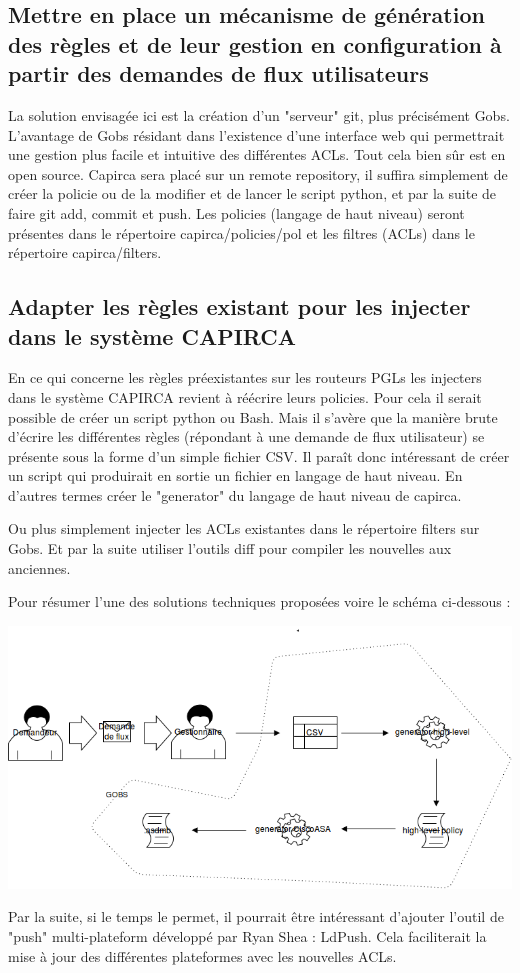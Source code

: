 \documentclass{article}
\begin{document}
\subsection{Mettre en place un mécanisme de génération des règles et de leur gestion en configuration à partir des demandes de flux utilisateurs}

La solution envisagée ici est la création d’un "serveur" git, plus précisément Gobs. L’avantage de Gobs résidant dans l’existence d’une interface web qui permettrait une gestion plus facile et intuitive des différentes ACLs. Tout cela bien sûr est en open source. Capirca sera placé sur un remote repository, il suffira simplement de créer la policie ou de la modifier et de lancer le script python, et par la suite de faire git add, commit et push. Les policies (langage de haut niveau) seront présentes dans le répertoire capirca/policies/pol et les filtres (ACLs) dans le répertoire capirca/filters. 

\maketitle
\subsection{Adapter les règles existant pour les injecter dans le système CAPIRCA}

En ce qui concerne les règles préexistantes sur les routeurs PGLs les injecters dans le système CAPIRCA revient à réécrire leurs policies. Pour cela il serait possible de créer un script python ou Bash. Mais il s’avère que la manière brute d’écrire les différentes règles (répondant à une demande de flux utilisateur) se présente sous la forme d’un simple fichier CSV. Il paraît donc intéressant de créer un script qui produirait en sortie un fichier en langage de haut niveau. En d’autres termes créer le "generator" du langage de haut niveau de capirca.

Ou plus simplement injecter les ACLs existantes dans le répertoire filters sur Gobs. Et par la suite utiliser l'outils diff pour compiler les nouvelles aux anciennes. 
 
Pour résumer l'une des solutions techniques proposées voire le schéma ci-dessous :

\centerline{\includegraphics[scale=0.4]{spec.png}}

Par la suite, si le temps le permet, il pourrait être intéressant d'ajouter l'outil de "push" multi-plateform développé par Ryan Shea : LdPush. Cela faciliterait la mise à jour des différentes plateformes avec les nouvelles ACLs.
\end{document}
